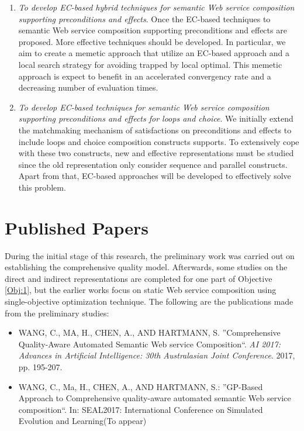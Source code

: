\begin{enumerate}
\begin{enumerate}
  \item \emph{To develop EC-based hybrid techniques for semantic Web service composition supporting preconditions and effects}. Once the EC-based techniques to semantic Web service composition supporting preconditions and effects are proposed. More effective techniques should be developed. In particular, we aim to create a memetic approach that utilize an EC-based approach and a local search strategy for avoiding trapped by local optimal. This memetic approach is expect to benefit in an accelerated convergency rate and a decreasing number of evaluation times.
    
   \item \emph{To develop EC-based techniques for semantic Web service composition supporting preconditions and effects for loops and choice}. We initially extend the matchmaking mechanism of satisfactions on preconditions and effects to include loops and choice composition constructs supports. To extensively cope with these two constructs, new and effective representations must be studied since the old representation only consider sequence and parallel constructs. Apart from that, EC-based approaches will be developed to effectively solve this problem.

 
 \end{enumerate}
 
\end{enumerate}

\section{Published Papers}

During the initial stage of this research, the preliminary work was carried out on establishing the comprehensive quality model.  Afterwards, some studies on the direct and indirect representations are completed for one part of Objective \ref{Obj:1}, but the earlier works focus on static Web service composition using single-objective optimization technique. The following are the publications made from the preliminary studies:

\begin{itemize}
 \item WANG, C., MA, H., CHEN, A., AND HARTMANN, S. ''Comprehensive Quality-Aware Automated Semantic Web service Composition``. \textit{AI 2017: Advances in Artificial Intelligence: 30th Australasian Joint Conference}. 2017, pp. 195-207.
 \item WANG, C., Ma, H., CHEN, A., AND HARTMANN, S.: ''GP-Based Approach to Comprehensive quality-aware automated semantic Web service composition``. In: SEAL2017: International Conference on Simulated Evolution and Learning(To appear)
\end{itemize}


